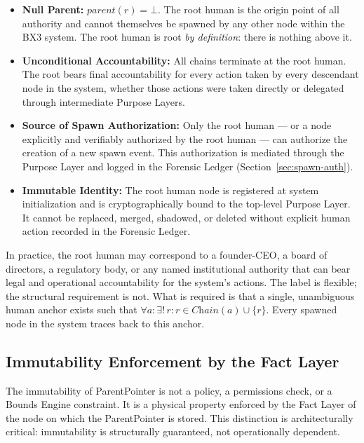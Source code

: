\begin{itemize}[noitemsep]
    \item \textbf{Null Parent:} $\textit{parent}(r) = \bot$. The root human is the origin point of all authority and cannot themselves be spawned by any other node within the BX3 system. The root human is root \textit{by definition}: there is nothing above it.
    \item \textbf{Unconditional Accountability:} All chains terminate at the root human. The root bears final accountability for every action taken by every descendant node in the system, whether those actions were taken directly or delegated through intermediate Purpose Layers.
    \item \textbf{Source of Spawn Authorization:} Only the root human --- or a node explicitly and verifiably authorized by the root human --- can authorize the creation of a new spawn event. This authorization is mediated through the Purpose Layer and logged in the Forensic Ledger (Section~\ref{sec:spawn-auth}).
    \item \textbf{Immutable Identity:} The root human node is registered at system initialization and is cryptographically bound to the top-level Purpose Layer. It cannot be replaced, merged, shadowed, or deleted without explicit human action recorded in the Forensic Ledger.
\end{itemize}

In practice, the root human may correspond to a founder-CEO, a board of directors, a regulatory body, or any named institutional authority that can bear legal and operational accountability for the system's actions. The label is flexible; the structural requirement is not. What is required is that a single, unambiguous human anchor exists such that $\forall a: \exists!\, r: r \in \textit{Chain}(a) \cup \{r\}$. Every spawned node in the system traces back to this anchor.

\subsection{Immutability Enforcement by the Fact Layer}
\label{sec:immutability-enforcement}

The immutability of ParentPointer is not a policy, a permissions check, or a Bounds Engine constraint. It is a physical property enforced by the Fact Layer of the node on which the ParentPointer is stored. This distinction is architecturally critical: immutability is structurally guaranteed, not operationally dependent.

